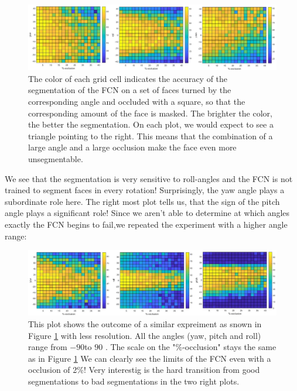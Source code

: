 \begin{figure}[h]
	\centering
	\includegraphics[width=\textwidth]{Figures/occVal_angles.png}
	\caption{The color of each grid cell indicates the accuracy of the segmentation of the FCN on a set of faces turned by the corresponding angle and occluded with a square, so that the corresponding amount of the face is masked. The brighter the color, the better the segmentation. On each plot, we would expect to see a triangle pointing to the right. This means that the combination of a large angle and a large occlusion make the face even more unsegmentable.}
	\label{fig:occVal40}
\end{figure}
We see that the segmentation is very sensitive to roll-angles and the FCN is not trained to segment faces in every rotation! Surprisingly, the yaw angle plays a subordinate role here. The right most plot tells us, that the sign of the pitch angle plays a significant role! Since we aren't able to determine at which angles exactly the FCN begins to fail,we repeated the experiment with a higher angle range:\\

\begin{figure}[h!]
	\centering
	\includegraphics[width=\textwidth]{Figures/occVal_angles_90.png}
	\caption{This plot shows the outcome of a similar expreiment as snown in Figure \ref{fig:occVal40} with less resolution. All the angles (yaw, pitch and roll) range from $-90$\textdegree to $90$ \textdegree. The scale on the "\%-occlusion" stays the same as in Figure \ref{fig:occVal40} We can clearly see the limits of the FCN even with a occlusion of 2\%! Very interestig is the hard transition from good segmentations to bad segmentations in the two right plots.}
	\label{fig:occVal90}
\end{figure}

